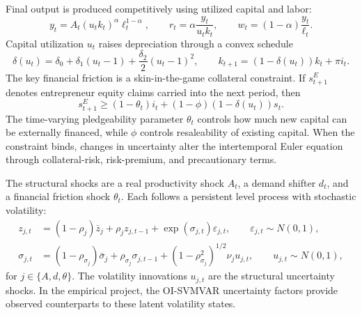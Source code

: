 \documentclass[12pt]{article}
\begin{document}
Final output is produced competitively using utilized capital and labor:
\begin{equation}
y_t=A_t(u_t k_t)^\alpha \ell_t^{1-\alpha},
\qquad
r_t=\alpha\frac{y_t}{u_t k_t},
\qquad
w_t=(1-\alpha)\frac{y_t}{\ell_t}.
\label{app:fvgq-production}
\end{equation}
Capital utilization $u_t$ raises depreciation through a convex schedule
\begin{equation}
\delta(u_t)=\delta_0+\delta_1(u_t-1)+\frac{\delta_2}{2}(u_t-1)^2,
\qquad
k_{t+1}=(1-\delta(u_t))k_t+\pi i_t.
\label{app:fvgq-capital}
\end{equation}
The key financial friction is a skin-in-the-game collateral constraint. If $s^E_{t+1}$ denotes
entrepreneur equity claims carried into the next period, then
\begin{equation}
s^E_{t+1}
\ge
(1-\theta_t)i_t+(1-\phi)(1-\delta(u_t))s_t.
\label{app:fvgq-collateral}
\end{equation}
The time-varying pledgeability parameter $\theta_t$ controls how much new capital can be
externally financed, while $\phi$ controls resaleability of existing capital. When the constraint
binds, changes in uncertainty alter the intertemporal Euler equation through collateral-risk,
risk-premium, and precautionary terms.

The structural shocks are a real productivity shock $A_t$, a demand shifter $d_t$, and a financial
friction shock $\theta_t$. Each follows a persistent level process with stochastic volatility:
\begin{align}
z_{j,t} &=(1-\rho_j)\bar z_j+\rho_j z_{j,t-1}
       +\exp(\sigma_{j,t})\varepsilon_{j,t},
       \qquad \varepsilon_{j,t}\sim N(0,1), \nonumber\\
\sigma_{j,t} &=(1-\rho_{\sigma_j})\bar\sigma_j
       +\rho_{\sigma_j}\sigma_{j,t-1}
       +(1-\rho_{\sigma_j}^2)^{1/2}\nu_j u_{j,t},
       \qquad u_{j,t}\sim N(0,1),
\label{app:fvgq-sv}
\end{align}
for $j\in\{A,d,\theta\}$. The volatility innovations $u_{j,t}$ are the structural uncertainty
shocks. In the empirical project, the OI-SVMVAR uncertainty factors provide observed
counterparts to these latent volatility states.
\end{document}
